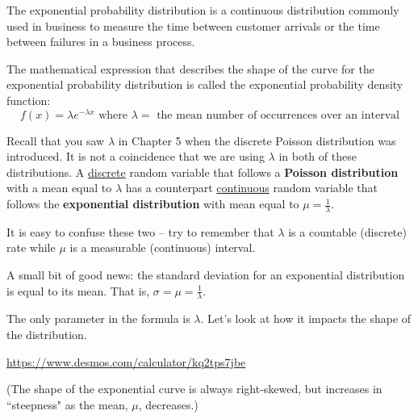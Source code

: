 \documentclass[12pt, letterpaper]{article}
\newcounter{visualconnection}
\theoremstyle{definition}
\begin{document}
\begin{statement}
The exponential probability distribution is a continuous distribution commonly used in business to measure the time between customer arrivals or the time between failures in a business process.

\vspace*{.1in}

The mathematical expression that describes the shape of the curve for the exponential probability distribution is called the exponential probability density function:
$$ f(x)=\lambda e^{-\lambda x}\text{  where } \lambda=\text{ the mean number of occurrences over an interval} $$

\vspace*{.1in}

Recall that you saw $\lambda$ in Chapter 5 when the discrete Poisson distribution was introduced.  It is not a coincidence that we are using $\lambda$ in both of these distributions.  A \underline{discrete} random variable that follows a \textbf{Poisson distribution} with a mean equal to $\lambda$ has a counterpart \underline{continuous} random variable that follows the \textbf{exponential distribution} with mean equal to $\mu = \frac{1}{\lambda}$.

\vspace*{.1in}

It is easy to confuse these two -- try to remember that $\lambda$ is a countable (discrete) rate while $\mu$ is a measurable (continuous) interval.

\vspace*{.1in}

A small bit of good news: the standard deviation for an exponential distribution is equal to its mean.  That is, $\sigma = \mu = \frac{1}{\lambda}$.


\end{statement}

\begin{visualconnection}
The only parameter in the formula is $\lambda$.  Let's look at how it impacts the shape of the distribution.
\begin{center}
\href{https://www.desmos.com/calculator/kq2tps7jbe}{https://www.desmos.com/calculator/kq2tps7jbe}
\end{center}
\end{visualconnection}

\begin{statement}
(The shape of the exponential curve is always right-skewed, but increases in ``steepness" as the mean, $\mu$, decreases.)
\end{statement}
\end{document}
